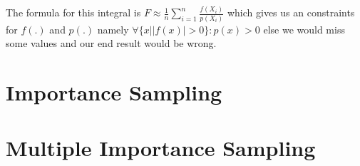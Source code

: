 

The formula for this integral is $ F \approx \frac{1}{n} \sum_{i = 1}^n \frac{f(X_i)}{p(X_i)} $ which gives us an constraints for $ f(.) $ and $ p(.) $
namely $ \forall \{x | |f(x)| > 0\}: p(x) > 0 $ else we would miss some values and our end result would be wrong. \cite[Chapter~13.2]{pbr-book}



\section{Importance Sampling}
\label{sec:importance_sampling}



\section{Multiple Importance Sampling}
\label{sec:multiple_importance_sampling}

